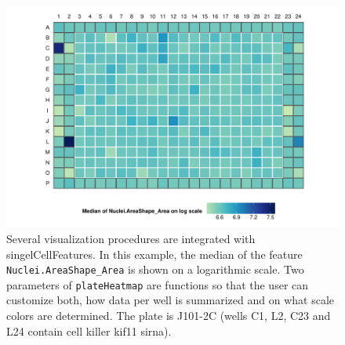 \begin{knitrout}
\color{fgcolor}\begin{figure}

{\centering \includegraphics[width=.95\linewidth]{figures/R/heatmap-demo-scf-heatmap-1} 

}

\caption[An example heatmap plot as produced by \texttt{plateHeatmap}.]{Several visualization procedures are integrated with singelCellFeatures. In this example, the median of the feature \texttt{Nuclei.AreaShape_Area} is shown on a logarithmic scale. Two parameters of \texttt{plateHeatmap} are functions so that the user can customize both, how data per well is summarized and on what scale colors are determined. The plate is J101-2C (wells C1, L2, C23 and L24 contain cell killer \gls{kif11} \gls{sirna}).}\label{fig:scf-heatmap}
\end{figure}


\end{knitrout}
